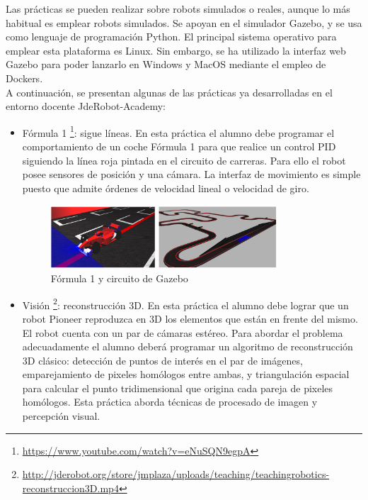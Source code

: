 Las prácticas se pueden realizar sobre robots simulados o reales, aunque lo más habitual es emplear robots simulados. Se apoyan en el simulador Gazebo, y se usa como lenguaje de programación Python. El principal sistema operativo para emplear esta plataforma es Linux. Sin embargo, se ha utilizado la interfaz web Gazebo para poder lanzarlo en Windows y MacOS mediante el empleo de Dockers.\\

A continuación, se presentan algunas de las prácticas ya desarrolladas en el entorno docente JdeRobot-Academy:

\begin{itemize}
\item Fórmula 1 \footnote{\url{https://www.youtube.com/watch?v=eNuSQN9egpA}}: sigue líneas. En esta práctica el alumno debe programar el comportamiento de un coche Fórmula 1 para que realice un control PID siguiendo la línea roja pintada en el circuito de carreras. Para ello el robot posee sensores de posición y una cámara. La interfaz de movimiento es simple puesto que admite órdenes de velocidad lineal o velocidad de giro.
\begin{figure}[H]
  \begin{center}
    \includegraphics[width=0.8\textwidth]{figures/Introduccion/F1.png}
		\caption{Fórmula 1 y circuito de Gazebo}
		\label{fig.F1}
		\end{center}
\end{figure}
\item Visión \footnote{\url{http://jderobot.org/store/jmplaza/uploads/teaching/teachingrobotics-reconstruccion3D.mp4}}: reconstrucción 3D. En esta práctica el alumno debe lograr que un robot Pioneer reproduzca en 3D los elementos que están en frente del mismo. El robot cuenta con un par de cámaras estéreo. Para abordar el problema adecuadamente el alumno deberá programar un algoritmo de reconstrucción 3D clásico: detección de puntos de interés en el par de imágenes, emparejamiento de pixeles homólogos entre ambas, y triangulación espacial para calcular el punto tridimensional que origina cada pareja de pixeles homólogos. Esta práctica aborda técnicas de procesado de imagen y percepción visual.
\begin{figure}[H]

\end{figure}
\end{itemize}
